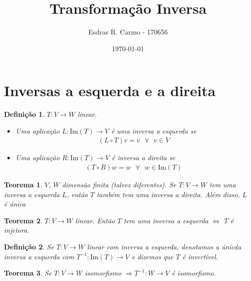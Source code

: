 \documentclass{article}
\author{Esdras R. Carmo - 170656}
\title{Transformação Inversa}
\date{\today}
\newcommand{\imagem}[1] {\text{Im} \left( #1 \right)}
\newcommand{\deffunc}[3] {#1: #2 \longrightarrow #3}
\newtheorem{theorem}{Teorema}[section]
\newtheorem{definition}{Definição}[section]
\begin{document}
    \maketitle
    
    \section{Inversas a esquerda e a direita}
        \begin{definition}
            $\deffunc{T}{V}{W}$ linear.

            \begin{itemize}
                \item Uma aplicação $\deffunc{L}{\imagem{T}}{V}$ é uma inversa
                    a esquerda se \begin{align*}(L \circ T) v = v\text{ } \forall\text{ }v \in V\end{align*}
                \item Uma aplicação $\deffunc{R}{\imagem{T}}{V}$ é inversa a direita se 
                    \begin{align*}(T \circ R) w = w\text{ }\forall\text{ }w \in \imagem{T}\end{align*}
            \end{itemize}
        \end{definition}

        \begin{theorem}
            $V$, $W$ dimensão finita (talvez diferentes). Se $\deffunc{T}{V}{W}$ tem uma inversa
            a esquerda $L$, então $T$ também tem uma inversa a direita. Além disso, $L$ é única
        \end{theorem}
        
        \begin{theorem}
            $\deffunc{T}{V}{W}$ linear. Então $T$ tem uma inversa a esquerda $\Leftrightarrow$ $T$ é injetora.
        \end{theorem}

        \begin{definition}
            Se $\deffunc{T}{V}{W}$ linear com inversa a esquerda, denotamos a únicda
            inversa a esquerda com $\deffunc{T^{-1}}{\imagem{T}}{V}$ e dizemos que $T$ é 
            invertível.
        \end{definition}

        \begin{theorem}
            Se $\deffunc{T}{V}{W}$ isomorfismo $\Rightarrow \deffunc{T^{-1}}{W}{V}$ é isomorfismo.
        \end{theorem}
\end{document}
